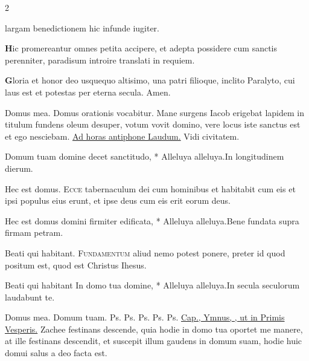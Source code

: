 \begin{multicols*}{2}
{largam benedictionem
hic infunde iugiter.
\par {\bfseries \color{Red} H}ic promereantur omnes
petita accipere,
et adepta possidere
cum sanctis perenniter,
paradisum introire
translati in requiem.
\par {\bfseries \color{Blue} G}loria et honor deo
usquequo altisimo,
una patri filioque,
inclito Paralyto,
cui laus est et potestas
per eterna secula. Amen.
}
\newline \V Domus mea. \R Domus orationis vocabitur.
 Mane surgens Iacob erigebat lapidem in titulum fundens oleum desuper, votum vovit domino, vere locus iste sanctus est et ego nesciebam. \ul{Ad horas antiphone Laudum.}
 Vidi civitatem.
\begin{responsory-breve}
{Domum tuam domine decet sanctitudo, * Alleluya alleluya.}{In longitudinem dierum.}
\end{responsory-breve}%
\V Hec est domus.
\lettrine[lines=2]{\zallmancaps \color{Blue} E}{cce} tabernaculum dei cum hominibus et habitabit cum eis et ipsi populus eius erunt, et ipse deus cum eis erit eorum deus.
\begin{responsory-breve}
{Hec est domus domini firmiter edificata, * Alleluya alleluya.}{Bene fundata supra firmam petram.}
\end{responsory-breve}%
\V Beati qui habitant.
\lettrine[lines=2]{\zallmancaps \color{Red} F}{undamentum} aliud nemo potest ponere, preter id quod positum est, quod est Christus Ihesus.
\begin{responsory-breve}
{Beati qui habitant In domo tua domine, * Alleluya alleluya.}{In secula seculorum laudabunt te.}
\end{responsory-breve}%
\V Domus mea.
 Domum tuam. {\color{Red} Ps.}  {\color{Red} Ps.}  {\color{Red} Ps.}  {\color{Red} Ps.}  {\color{Red} Ps.} 
\newline \ul{Cap., Ymnus, \Vbar , ut in Primis Vesperis.}
 Zachee festinans descende, quia hodie in domo tua oportet me manere, at ille festinans descendit, et suscepit illum gaudens in domum suam, hodie huic domui salus a deo facta est.

\end{multicols*}
